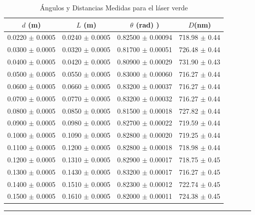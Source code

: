 \documentclass[10pt,a4paper]{article}
\begin{document}
	\begin{table}[H]
		\centering
		\begin{tabular}{|c|c|c|c|}
			\hline
			$d$ (m) & $L$ (m) & $\theta$ (rad) )&  $D$(nm) \\ \hline
			0.0220 $\pm$ 0.0005  & 0.0240 $\pm$ 0.0005 &  0.82500 $\pm$ 0.00094 & 718.98 $\pm$ 0.44 \\
			0.0300 $\pm$ 0.0005  & 0.0320 $\pm$ 0.0005 &  0.81700 $\pm$ 0.00051 & 726.48 $\pm$ 0.44 \\
			0.0400 $\pm$ 0.0005  & 0.0420 $\pm$ 0.0005 &  0.80900 $\pm$ 0.00029 & 731.90 $\pm$ 0.43 \\ 
			0.0500 $\pm$ 0.0005 & 0.0550 $\pm$ 0.0005 & 0.83000 $\pm$ 0.00060 & 716.27 $\pm$ 0.44 \\ 
			0.0600 $\pm$ 0.0005 & 0.0660 $\pm$ 0.0005 & 0.83200 $\pm$ 0.00037 &  716.27  $\pm$ 0.44 \\ 
			0.0700 $\pm$ 0.0005 & 0.0770 $\pm$ 0.0005 & 0.83200 $\pm$ 0.00032 & 716.27 $\pm$ 0.44  \\
			0.0800 $\pm$ 0.0005  & 0.0850 $\pm$ 0.0005 &  0.81500 $\pm$ 0.00018 & 727.82 $\pm$ 0.44  \\ 
			0.0900 $\pm$ 0.0005 & 0.0980 $\pm$ 0.0005 &  0.82700 $\pm$ 0.00022 & 719.59 $\pm$ 0.44  \\
			0.1000 $\pm$ 0.0005 & 0.1090 $\pm$ 0.0005 &  0.82800 $\pm$ 0.00020 & 719.25 $\pm$ 0.44   \\
			0.1100 $\pm$ 0.0005 & 0.1200 $\pm$ 0.0005 &  0.82800 $\pm$ 0.00018 & 718.98 $\pm$ 0.44  \\
			0.1200 $\pm$ 0.0005 & 0.1310 $\pm$ 0.0005 &  0.82900 $\pm$ 0.00017 & 718.75 $\pm$ 0.45   \\
			0.1300 $\pm$ 0.0005 & 0.1430 $\pm$ 0.0005 &  0.83200 $\pm$ 0.00017 & 716.27 $\pm$ 0.45  \\
			0.1400 $\pm$ 0.0005 & 0.1510 $\pm$ 0.0005 &  0.82300 $\pm$ 0.00012 & 722.74 $\pm$ 0.45   \\
			0.1500 $\pm$ 0.0005 & 0.1610 $\pm$ 0.0005 &  0.82000 $\pm$ 0.00011 & 724.38 $\pm$ 0.45   \\ \hline
			
		\end{tabular}
		\caption{Ángulos y Distancias Medidas para el láser verde}
		\label{tab:angulos_distancias 2.}
		\rule{100mm}{0.1mm}
	\end{table}
\end{document}
